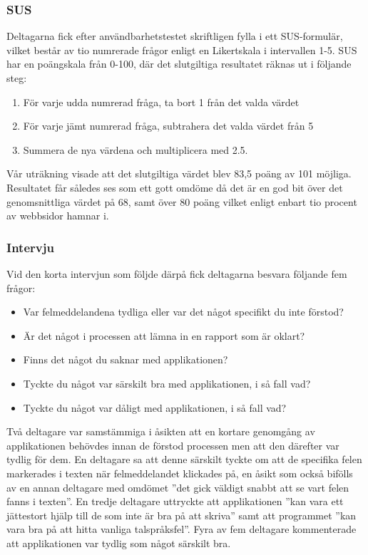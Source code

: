 \documentclass[swedish]{maucsthesis}
\begin{document}
\subsubsection{SUS}

Deltagarna fick efter användbarhetstestet skriftligen fylla i ett SUS-formulär, vilket består av tio
numrerade frågor enligt en Likertskala i intervallen 1-5. SUS har en poängskala från 0-100, där det
slutgiltiga resultatet räknas ut i följande steg:

\begin{enumerate}
\item För varje udda numrerad fråga, ta bort 1 från det valda värdet
\item För varje jämt numrerad fråga, subtrahera det valda värdet från 5
\item Summera de nya värdena och multiplicera med 2.5.
\end{enumerate}

Vår uträkning visade att det slutgiltiga värdet blev 83,5 poäng av 101 möjliga.
Resultatet får således ses som ett gott omdöme då det är en god bit över det
genomsnittliga värdet på 68, samt över 80 poäng vilket enligt
\cite{laubheimer:2018} enbart tio procent av webbsidor hamnar i.

\subsubsection{Intervju}

Vid den korta intervjun som följde därpå fick deltagarna besvara följande fem
frågor:
\begin{itemize}
\item Var felmeddelandena tydliga eller var det något specifikt du inte förstod?
\item Är det något i processen att lämna in en rapport som är oklart?
\item Finns det något du saknar med applikationen?
\item Tyckte du något var särskilt bra med applikationen, i så fall vad?
\item Tyckte du något var dåligt med applikationen, i så fall vad?
\end{itemize}

Två deltagare var samstämmiga i åsikten att en kortare genomgång av
applikationen behövdes innan de förstod processen men att den därefter var
tydlig för dem. En deltagare sa att denne särskilt tyckte om att de specifika
felen markerades i texten när felmeddelandet klickades på, en åsikt som också
bifölls av en annan deltagare med omdömet ”det gick väldigt snabbt att se vart
felen fanns i texten”. En tredje deltagare uttryckte att applikationen ”kan vara
ett jättestort hjälp till de som inte är bra på att skriva” samt att programmet
”kan vara bra på att hitta vanliga talspråksfel”. Fyra av fem deltagare
kommenterade att applikationen var tydlig som något särskilt bra.
\end{document}
